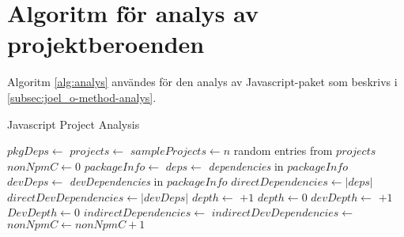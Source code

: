\section{Algoritm för analys av projektberoenden}
\label{app:algorithm}

Algoritm \ref{alg:analys} användes för den analys av Javascript-paket som beskrivs i \ref{subsec:joel_o-method-analys}.

\begin{algorithm}[H]
\caption{Javascript Project Analysis} \label{alg:analys}
\begin{algorithmic}[1]
      \State \Return
    \EndIf
    \State
    \State $pkgDeps \gets$ 
    \State {}
    \State
      \State {}
    \EndFor
  \EndFunction
  \State
    \State $projects \gets $ 
    \State $sampleProjects \gets n$ random entries from $projects$
    \State
    \State $nonNpmC \gets 0$
        \State $packageInfo \gets $ 
        \State $deps \gets $ \textit{dependencies} in $packageInfo$
        \State $devDeps \gets $ \textit{devDependencies} in $packageInfo$
        \State
        \State {}
        \State
        \State $directDependencies \gets |deps|$
        \State $directDevDependencies \gets |devDeps|$
        \State
            \State{}
          \EndFor
          \State
          \State $depth \gets$  $+ 1$
        \Else
          \State $depth \gets 0$
        \EndIf
        \State
            \State {}
          \EndFor
          \State
          \State $devDepth \gets$  $+ 1$
        \Else
          \State $DevDepth \gets 0$
        \EndIf
        \State
        \State $indirectDependencies \gets$ 
        \State $indirectDevDependencies \gets$ 
        \State {}
      \Else
        \State $nonNpmC \gets nonNpmC + 1$
      \EndIf
    \EndFor
  \EndFunction
\end{algorithmic}
\end{algorithm}


